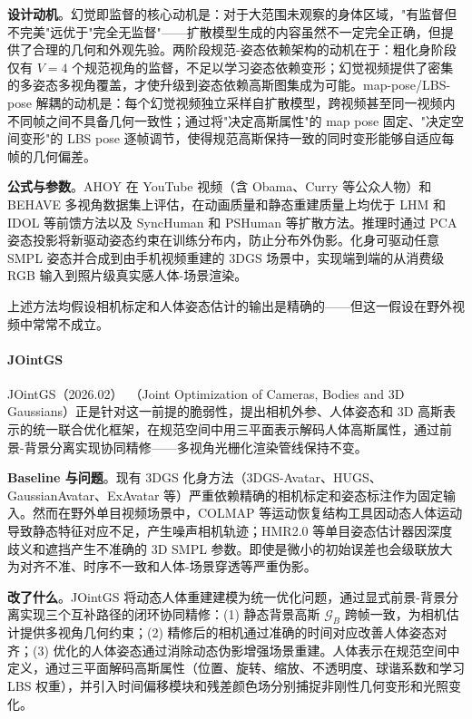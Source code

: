 \textbf{设计动机}。幻觉即监督的核心动机是：对于大范围未观察的身体区域，"有监督但不完美"远优于"完全无监督"——扩散模型生成的内容虽然不一定完全正确，但提供了合理的几何和外观先验。两阶段规范-姿态依赖架构的动机在于：粗化身阶段仅有 $V{=}4$ 个规范视角的监督，不足以学习姿态依赖变形；幻觉视频提供了密集的多姿态多视角覆盖，才使升级到姿态依赖高斯图集成为可能。map-pose/LBS-pose 解耦的动机是：每个幻觉视频独立采样自扩散模型，跨视频甚至同一视频内不同帧之间不具备几何一致性；通过将"决定高斯属性"的 map pose 固定、"决定空间变形"的 LBS pose 逐帧调节，使得规范高斯保持一致的同时变形能够自适应每帧的几何偏差。

\textbf{公式与参数}。AHOY 在 YouTube 视频（含 Obama、Curry 等公众人物）和 BEHAVE 多视角数据集上评估，在动画质量和静态重建质量上均优于 LHM 和 IDOL 等前馈方法以及 SyncHuman 和 PSHuman 等扩散方法。推理时通过 PCA 姿态投影将新驱动姿态约束在训练分布内，防止分布外伪影。化身可驱动任意 SMPL 姿态并合成到由手机视频重建的 3DGS 场景中，实现端到端的从消费级 RGB 输入到照片级真实感人体-场景渲染。

上述方法均假设相机标定和人体姿态估计的输出是精确的——但这一假设在野外视频中常常不成立。

\paragraph{JOintGS}

JOintGS（2026.02）~\cite{2602_04317}（Joint Optimization of Cameras, Bodies and 3D Gaussians）正是针对这一前提的脆弱性，提出相机外参、人体姿态和 3D 高斯表示的统一联合优化框架，在规范空间中用三平面表示解码人体高斯属性，通过前景-背景分离实现协同精修——多视角光栅化渲染管线保持不变。

\textbf{Baseline 与问题}。现有 3DGS 化身方法（3DGS-Avatar、HUGS、GaussianAvatar、ExAvatar 等）严重依赖精确的相机标定和姿态标注作为固定输入。然而在野外单目视频场景中，COLMAP 等运动恢复结构工具因动态人体运动导致静态特征对应不足，产生噪声相机轨迹；HMR2.0 等单目姿态估计器因深度歧义和遮挡产生不准确的 3D SMPL 参数。即使是微小的初始误差也会级联放大为对齐不准、时序不一致和人体-场景穿透等严重伪影。

\textbf{改了什么}。JOintGS 将动态人体重建建模为统一优化问题，通过显式前景-背景分离实现三个互补路径的闭环协同精修：(1) 静态背景高斯 $\mathcal{G}_B$ 跨帧一致，为相机估计提供多视角几何约束；(2) 精修后的相机通过准确的时间对应改善人体姿态对齐；(3) 优化的人体姿态通过消除动态伪影增强场景重建。人体表示在规范空间中定义，通过三平面解码高斯属性（位置、旋转、缩放、不透明度、球谐系数和学习 LBS 权重），并引入时间偏移模块和残差颜色场分别捕捉非刚性几何变形和光照变化。

